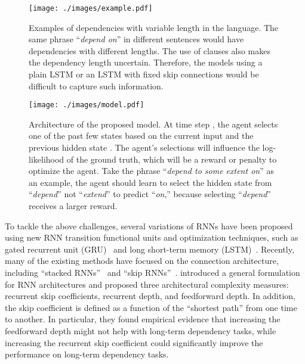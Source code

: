 \documentclass[letterpaper]{article} \usepackage{aaai19}  \usepackage{times}  \usepackage{helvet}  \usepackage{courier}  \usepackage{url}  \usepackage{graphicx}  \usepackage{amsmath}
\begin{document}
\begin{figure}[t]
\centering
  \texttt{[image: ./images/example.pdf]}
  \caption{Examples of dependencies with variable length in the language. The same phrase ``\textit{depend on}'' in different sentences would have dependencies with different lengths. The use of clauses also makes the dependency length uncertain. Therefore, the models using a plain LSTM or an LSTM with fixed skip connections would be difficult to capture such information.} \label{fig:example}
\end{figure}

\begin{figure*}[t!]
\centering
\texttt{[image: ./images/model.pdf]}
\caption{Architecture of the proposed model. At time step , the agent selects one of the past few states based on the current input  and the previous hidden state . The agent's selections will influence the log-likelihood of the ground truth, which will be a reward or penalty to optimize the agent. Take the phrase ``\textit{depend to some extent  on}'' as an example, the agent should learn to select the hidden state from ``\textit{depend}'' not ``\textit{extend}'' to predict ``\textit{on},'' because selecting ``\textit{depend}'' receives a larger reward.} \label{fig:model}
\end{figure*}

To tackle the above challenges, several variations of RNNs have been proposed using new RNN transition functional units and optimization techniques, such as gated recurrent unit (GRU)~\cite{chung2014empirical} and long short-term memory (LSTM)~\cite{hochreiter1997long}. Recently, many of the existing methods have focused on the connection architecture, including ``stacked RNNs''~\cite{el1996hierarchical} and ``skip RNNs''~\cite{chang2017dilated}. \citeauthor{zhang2016architectural}  introduced a general formulation for RNN architectures and proposed three architectural complexity measures: recurrent skip coefficients, recurrent depth, and feedforward depth. In addition, the skip coefficient is defined as a function of the “shortest path” from one time to another. In particular, they found empirical evidence that increasing the feedforward depth might not help with long-term dependency tasks, while increasing the recurrent skip coefficient could significantly improve the performance on long-term dependency tasks.
\end{document}
